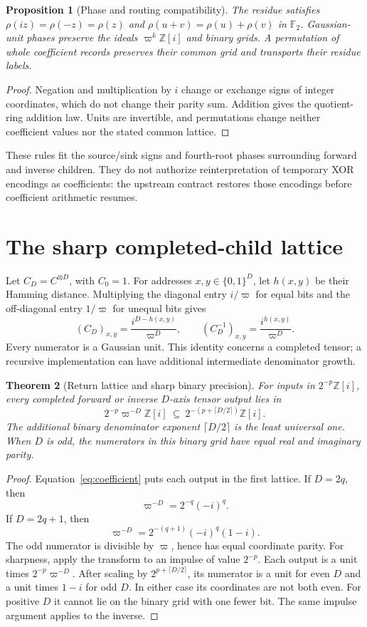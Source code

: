 \documentclass[11pt]{article}
\newtheorem{theorem}{Theorem}[section]
\newtheorem{proposition}[theorem]{Proposition}
\theoremstyle{definition}\newtheorem{definition}[theorem]{Definition}
\theoremstyle{remark}\newtheorem{remark}[theorem]{Remark}
\newcommand{\G}{\mathbb Z[i]}
\newcommand{\p}{\varpi}
\newcommand{\res}{\rho}
\begin{document}
\begin{proposition}[Phase and routing compatibility]\label{prop:phase}
The residue satisfies $\res(iz)=\res(-z)=\res(z)$ and
$\res(u+v)=\res(u)+\res(v)$ in $\mathbb F_2$. Gaussian-unit phases preserve the ideals $\p^k\G$ and binary grids. A permutation of whole coefficient records preserves their common grid and transports their residue labels.
\end{proposition}
\begin{proof}
Negation and multiplication by $i$ change or exchange signs of integer coordinates, which do not change their parity sum. Addition gives the quotient-ring addition law. Units are invertible, and permutations change neither coefficient values nor the stated common lattice.
\end{proof}
These rules fit the source/sink signs and fourth-root phases surrounding forward and inverse children. They do not authorize reinterpretation of temporary XOR encodings as coefficients: the upstream contract restores those encodings before coefficient arithmetic resumes.

\section{The sharp completed-child lattice}
Let $C_D=C^{\otimes D}$, with $C_0=1$. For addresses $x,y\in\{0,1\}^D$, let $h(x,y)$ be their Hamming distance. Multiplying the diagonal entry $i/\p$ for equal bits and the off-diagonal entry $1/\p$ for unequal bits gives
\begin{equation}\label{eq:coefficient}
 (C_D)_{x,y}=\frac{i^{D-h(x,y)}}{\p^D},\qquad
 (C_D^{-1})_{x,y}=\frac{i^{h(x,y)}}{\p^D}.
\end{equation}
Every numerator is a Gaussian unit. This identity concerns a completed tensor; a recursive implementation can have additional intermediate denominator growth.

\begin{theorem}[Return lattice and sharp binary precision]\label{thm:return}
For inputs in $2^{-p}\G$, every completed forward or inverse $D$-axis tensor output lies in
\[
 2^{-p}\p^{-D}\G\ \subseteq\ 2^{-(p+\lceil D/2\rceil)}\G.
\]
The additional binary denominator exponent $\lceil D/2\rceil$ is the least universal one. When $D$ is odd, the numerators in this binary grid have equal real and imaginary parity.
\end{theorem}
\begin{proof}
Equation~\eqref{eq:coefficient} puts each output in the first lattice. If $D=2q$, then
\[
 \p^{-D}=2^{-q}(-i)^q.
\]
If $D=2q+1$, then
\[
 \p^{-D}=2^{-(q+1)}(-i)^q(1-i).
\]
The odd numerator is divisible by $\p$, hence has equal coordinate parity. For sharpness, apply the transform to an impulse of value $2^{-p}$. Each output is a unit times $2^{-p}\p^{-D}$. After scaling by $2^{p+\lceil D/2\rceil}$, its numerator is a unit for even $D$ and a unit times $1-i$ for odd $D$. In either case its coordinates are not both even. For positive $D$ it cannot lie on the binary grid with one fewer bit. The same impulse argument applies to the inverse.
\end{proof}
\end{document}
